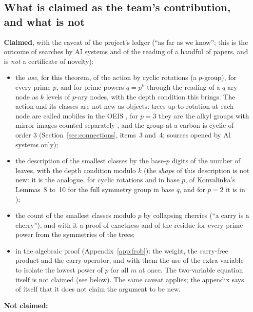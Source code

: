 \documentclass[11pt]{article}
\theoremstyle{definition}
\theoremstyle{remark}
\numberwithin{equation}{section}
\numberwithin{figure}{section}
\begin{document}
\subsection{What is claimed as the team's contribution, and what is not}\label{sec:attribution}
\textbf{Claimed}, with the caveat of the project's ledger (``as far as we know''; this is
the outcome of searches by AI systems and of the reading of a handful of papers, and is \emph{not} a
certificate of novelty):
\begin{itemize}[itemsep=1pt]
\item the \emph{use}, for this theorem, of the action by cyclic rotations (a $p$-group), for every prime $p$,
 and for prime powers $q=p^k$ through the reading of a $q$-ary node as $k$ levels of $p$-ary nodes, with the
 depth condition this brings. The action and its classes are not new as objects: trees up to rotation at each
 node are called mobiles in the OEIS \cite{OEISmobiles}, for $p=3$ they are the alkyl groups with mirror
 images counted separately \cite{OEISA000625}, and the group at a carbon is cyclic of order $3$ \cite{RHB}
 (Section~\ref{sec:connections}, items~3 and~4; sources opened by AI systems only);
\item the description of the smallest classes by the base-$p$ digits of the number of leaves, with the depth
 condition modulo $k$ (the \emph{shape} of this description is not new: it is the analogue, for cyclic
 rotations and in base $p$, of Konvalinka's Lemmas~8 to~10 for the full symmetry group in base $q$, and for
 $p=2$ it is in \cite{DeutschSagan,KerstingFischer});
\item the count of the smallest classes modulo $p$ by collapsing cherries (``a carry is a cherry''), and with
 it a proof of exactness and of the residue for every prime power from the symmetries of the trees;
\item in the algebraic proof (Appendix~\ref{app:frob}): the weight, the carry-free product and the carry
 operator, and with them the use of the extra variable to isolate the lowest power of $p$ for all $m$ at once.
 The two-variable equation itself is not claimed (see below). The same caveat applies; the appendix says of
 itself that it does not claim the argument to be new.
\end{itemize}
\textbf{Not claimed:}
\end{document}
